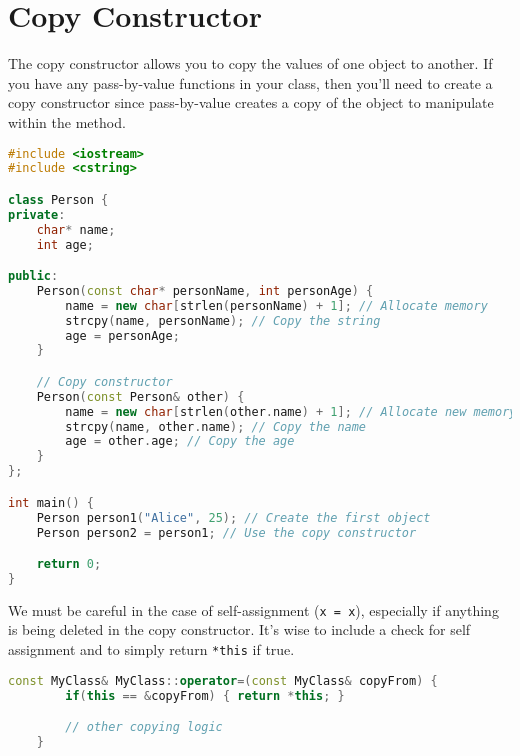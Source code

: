 \section{Copy Constructor}

The copy constructor allows you to copy the values of one object
to another. If you have any pass-by-value functions in your class, 
then you'll need to create a copy constructor since pass-by-value 
creates a copy of the object to manipulate within the method. 

\begin{lstlisting}[language=C++,caption=Copy Constructor]
#include <iostream>
#include <cstring>

class Person {
private:
    char* name;
    int age;

public:
    Person(const char* personName, int personAge) {
        name = new char[strlen(personName) + 1]; // Allocate memory
        strcpy(name, personName); // Copy the string
        age = personAge;
    }

    // Copy constructor
    Person(const Person& other) {
        name = new char[strlen(other.name) + 1]; // Allocate new memory
        strcpy(name, other.name); // Copy the name
        age = other.age; // Copy the age
    }
};

int main() {
    Person person1("Alice", 25); // Create the first object
    Person person2 = person1; // Use the copy constructor

    return 0;
}
\end{lstlisting}

We must be careful in the case of self-assignment (\texttt{x = x}), 
especially if anything is being deleted in the copy constructor. 
It's wise to include a check for self assignment and to simply 
return \texttt{*this} if true. 

\begin{lstlisting}[language=C++,caption=Self Assignment Check]
    const MyClass& MyClass::operator=(const MyClass& copyFrom) {
        if(this == &copyFrom) { return *this; }

        // other copying logic
    }
    \end{lstlisting}